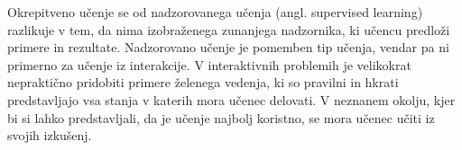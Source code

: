 \documentclass[a4paper, oneside, 12pt]{report}
\begin{document}
Okrepitveno učenje se od nadzorovanega učenja (angl. supervised learning) razlikuje v tem, da nima izobraženega zunanjega nadzornika, ki učencu predloži primere in rezultate. Nadzorovano učenje je pomemben tip učenja, vendar pa ni primerno za učenje iz interakcije. V interaktivnih problemih je velikokrat nepraktično pridobiti primere želenega vedenja, ki so pravilni in hkrati predstavljajo vsa stanja v katerih mora učenec delovati. V neznanem okolju, kjer bi si lahko predstavljali, da je učenje najbolj koristno, se mora učenec učiti iz svojih izkušenj.



\end{document}
